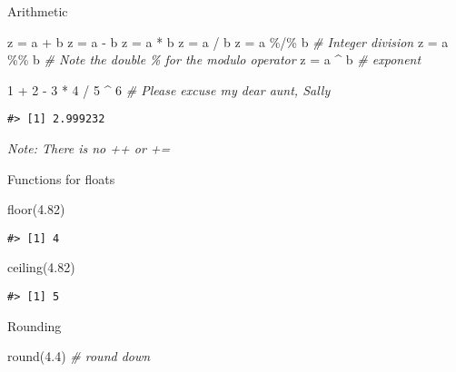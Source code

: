 \documentclass[
]{book}
\newenvironment{Shaded}{\begin{snugshade}}{\end{snugshade}}
\newcommand{\CommentTok}[1]{\textcolor[rgb]{0.56,0.35,0.01}{\textit{#1}}}
\newcommand{\DecValTok}[1]{\textcolor[rgb]{0.00,0.00,0.81}{#1}}
\newcommand{\FloatTok}[1]{\textcolor[rgb]{0.00,0.00,0.81}{#1}}
\newcommand{\FunctionTok}[1]{\textcolor[rgb]{0.00,0.00,0.00}{#1}}
\newcommand{\NormalTok}[1]{#1}
\newcommand{\OtherTok}[1]{\textcolor[rgb]{0.56,0.35,0.01}{#1}}
\newcommand{\SpecialCharTok}[1]{\textcolor[rgb]{0.00,0.00,0.00}{#1}}
\begin{document}
Arithmetic

\begin{Shaded}
\begin{Highlighting}[]
\NormalTok{z }\OtherTok{=}\NormalTok{ a }\SpecialCharTok{+}\NormalTok{ b}
\NormalTok{z }\OtherTok{=}\NormalTok{ a }\SpecialCharTok{{-}}\NormalTok{ b}
\NormalTok{z }\OtherTok{=}\NormalTok{ a }\SpecialCharTok{*}\NormalTok{ b}
\NormalTok{z }\OtherTok{=}\NormalTok{ a }\SpecialCharTok{/}\NormalTok{ b}
\NormalTok{z }\OtherTok{=}\NormalTok{ a }\SpecialCharTok{\%/\%}\NormalTok{ b }\CommentTok{\# Integer division}
\NormalTok{z }\OtherTok{=}\NormalTok{ a }\SpecialCharTok{\%\%}\NormalTok{ b }\CommentTok{\# Note the double \% for the modulo operator}
\NormalTok{z }\OtherTok{=}\NormalTok{ a }\SpecialCharTok{\^{}}\NormalTok{ b }\CommentTok{\# exponent}

\DecValTok{1} \SpecialCharTok{+} \DecValTok{2} \SpecialCharTok{{-}} \DecValTok{3} \SpecialCharTok{*} \DecValTok{4} \SpecialCharTok{/} \DecValTok{5} \SpecialCharTok{\^{}} \DecValTok{6} \CommentTok{\# Please excuse my dear aunt, Sally}
\end{Highlighting}
\end{Shaded}

\begin{verbatim}
#> [1] 2.999232
\end{verbatim}

\emph{Note: There is no ++ or +=}

Functions for floats

\begin{Shaded}
\begin{Highlighting}[]
\FunctionTok{floor}\NormalTok{(}\FloatTok{4.82}\NormalTok{)}
\end{Highlighting}
\end{Shaded}

\begin{verbatim}
#> [1] 4
\end{verbatim}

\begin{Shaded}
\begin{Highlighting}[]
\FunctionTok{ceiling}\NormalTok{(}\FloatTok{4.82}\NormalTok{)}
\end{Highlighting}
\end{Shaded}

\begin{verbatim}
#> [1] 5
\end{verbatim}

Rounding

\begin{Shaded}
\begin{Highlighting}[]
\FunctionTok{round}\NormalTok{(}\FloatTok{4.4}\NormalTok{) }\CommentTok{\# round down}
\end{Highlighting}
\end{Shaded}
\end{document}
